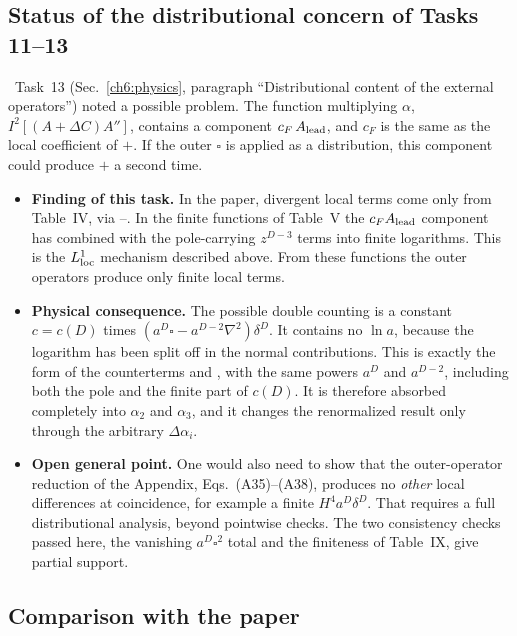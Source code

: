 \subsection{Status of the distributional concern of Tasks 11--13}
\label{sec:ch08-distr}
\tA\ Task~13 (Sec.~\ref{ch6:physics}, paragraph ``Distributional content of the external operators'') noted a possible problem. The function multiplying $\alpha$, $I^2[(A+\Delta C)A'']$, contains a component $c_F\,A_{\rm lead}$, and $c_F$ is the same as the local coefficient of $+$.
If the outer $\square$ is applied as a distribution, this component could produce $+$ a second time.
\begin{itemize}[leftmargin=*,itemsep=2pt]
\item \textbf{Finding of this task.} In the paper, divergent local terms come only from Table~IV, via --.
In the finite functions of Table~V the $c_F A_{\rm lead}$ component has combined with the pole-carrying $z^{D-3}$ terms into finite logarithms. This is the $L^1_{\rm loc}$ mechanism described above.
From these functions the outer operators produce only finite local terms.
\item \textbf{Physical consequence.} The possible double counting is a constant $c=c(D)$ times $(a^D\square-a^{D-2}\nabla^2)\delta^D$.
It contains no $\ln a$, because the logarithm has been split off in the normal contributions.
This is exactly the form of the counterterms  and , with the same powers $a^D$ and $a^{D-2}$, including both the pole and the finite part of $c(D)$.
It is therefore absorbed completely into $\alpha_2$ and $\alpha_3$, and it changes the renormalized result  only through the arbitrary $\Delta\alpha_i$.
\item \textbf{Open general point.} One would also need to show that the outer-operator reduction of the Appendix, Eqs.~(A35)--(A38), produces no \emph{other} local differences at coincidence, for example a finite $H^4a^D\delta^D$.
That requires a full distributional analysis, beyond pointwise checks.
The two consistency checks passed here, the vanishing $a^D\square^2$ total and the finiteness of Table~IX, give partial support.
\end{itemize}

\subsection{Comparison with the paper}

